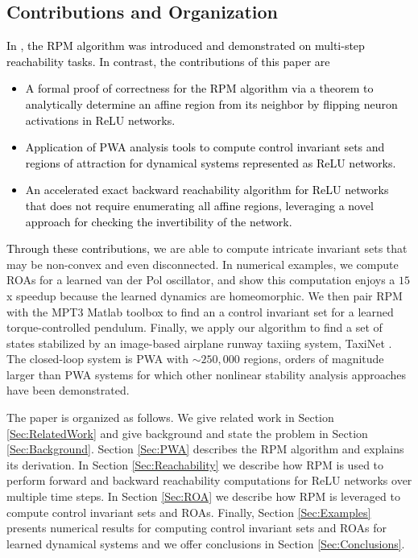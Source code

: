  \subsection{Contributions and Organization}
\textcolor{black}{In \cite{VincentSchwagerICRA21RPM}, the RPM algorithm was introduced and demonstrated on multi-step reachability tasks. 
In contrast, the contributions of this paper are
\begin{itemize}
     \item \textcolor{black}{A formal proof of correctness for the RPM algorithm via} a theorem to analytically determine an \textcolor{black}{affine region} from its neighbor by flipping neuron activations in ReLU networks. 
     \item Application of PWA analysis tools to compute control invariant sets and regions of attraction for dynamical systems represented as ReLU networks.
     \item An accelerated exact backward reachability algorithm for ReLU networks \textcolor{black}{that does not require enumerating all affine regions}, leveraging a novel \textcolor{black}{approach} for checking the invertibility of the network.
\end{itemize}}


\textcolor{black}{Through these contributions,} we are able to compute intricate invariant sets that may be non-convex and even disconnected.
In numerical examples, we compute ROAs for a learned van der Pol oscillator, and show this computation enjoys a $15$x speedup because the learned dynamics are homeomorphic. 
We then pair RPM with the MPT3 \cite{MPT3} Matlab toolbox to find an a control invariant set for a learned torque-controlled pendulum. 
Finally, we apply our algorithm to find a set of states stabilized by an image-based airplane runway taxiing system, TaxiNet \cite{verify_gan}. 
The closed-loop system is PWA with ${\sim}250,000$ regions, orders of magnitude larger than PWA systems for which other nonlinear stability analysis approaches have been demonstrated.

The paper is organized as follows.
We give related work in Section \ref{Sec:RelatedWork} and give background and state the problem in Section \ref{Sec:Background}. 
Section \ref{Sec:PWA} describes the RPM algorithm and explains its derivation. 
In Section \ref{Sec:Reachability} we describe how RPM is used to perform forward and backward reachability computations for ReLU networks over multiple time steps. 
In Section \ref{Sec:ROA} we describe how RPM is leveraged to compute control invariant sets and ROAs. 
Finally, Section \ref{Sec:Examples} presents numerical results for computing control invariant sets and ROAs for learned dynamical systems and we offer conclusions in Section \ref{Sec:Conclusions}. 

